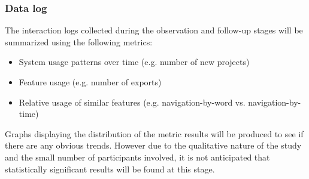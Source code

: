 \subsubsection{Data log}
The interaction logs collected during the observation and follow-up stages will
be summarized using the following metrics:
\begin{itemize}
\item System usage patterns over time (e.g. number of new projects)
\item Feature usage (e.g. number of exports)
\item Relative usage of similar features (e.g. navigation-by-word vs. navigation-by-time)
\end{itemize}

Graphs displaying the distribution of the metric results will be produced to
see if there are any obvious trends. However due to the qualitative nature of
the study and the small number of participants involved, it is not anticipated
that statistically significant results will be found at this stage.

